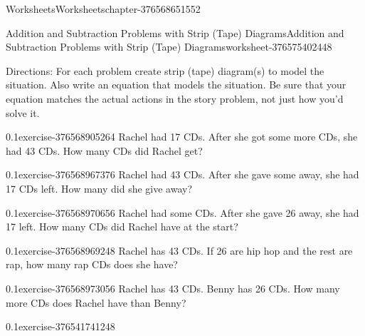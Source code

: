 \documentclass[twoside,11pt,]{book}
\begin{document}
\begin{chapterptx}{Worksheets}{}{Worksheets}{}{}{chapter-376568651552}
%
%
\typeout{************************************************}
\typeout{************************************************}
%
\begin{worksheet-section-numberless}{Addition and Subtraction Problems with Strip (Tape) Diagrams}{}{Addition and Subtraction Problems with Strip (Tape) Diagrams}{}{}{worksheet-376575402448}
\begin{introduction}{}%
\hypertarget{p-376568959280}{}%
Directions: For each problem create strip (tape) diagram(s) to model the situation.  Also write an equation that models the situation.  Be sure that your equation matches the actual actions in the story problem, not just how you’d solve it.%
\end{introduction}%
\begin{divisionexercise}{1}{}{0.1}{exercise-376568905264}%
\hypertarget{p-376568904528}{}%
Rachel had 17 CDs.  After she got some more CDs, she had 43 CDs.  How many CDs did Rachel get?%
\end{divisionexercise}%
\begin{divisionexercise}{2}{}{0.1}{exercise-376568967376}%
\hypertarget{p-376568966640}{}%
Rachel had 43 CDs.  After she gave some away, she had 17 CDs left.  How many did she give away?%
\end{divisionexercise}%
\begin{divisionexercise}{3}{}{0.1}{exercise-376568970656}%
\hypertarget{p-376568970016}{}%
Rachel had some CDs.  After she gave 26 away, she had 17 left.  How many CDs did Rachel have at the start?%
\end{divisionexercise}%
\begin{divisionexercise}{4}{}{0.1}{exercise-376568969248}%
\hypertarget{p-376568973808}{}%
Rachel has 43 CDs.  If 26 are hip hop and the rest are rap, how many rap CDs does she have?%
\end{divisionexercise}%
\begin{divisionexercise}{5}{}{0.1}{exercise-376568973056}%
\hypertarget{p-376568972320}{}%
Rachel has 43 CDs.  Benny has 26 CDs.  How many more CDs does Rachel have than Benny?%
\end{divisionexercise}%
\begin{divisionexercise}{6}{}{0.1}{exercise-376541741248}%
\hypertarget{p-376541740608}{}%

\end{divisionexercise}
\end{worksheet-section-numberless}
\end{chapterptx}
\end{document}
